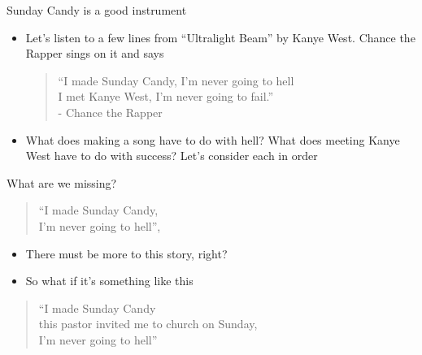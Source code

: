 \documentclass{beamer}
\begin{document}
\begin{frame}{Sunday Candy is a good instrument}

\begin{itemize}
		\item Let's listen to a few lines from ``Ultralight Beam'' by Kanye West. Chance the Rapper sings on it and says

\begin{quote}
``I made Sunday Candy, I'm never going to hell \\


I met Kanye West, I'm never going to fail.'' \\


- Chance the Rapper
\end{quote}

	\item What does making a song have to do with hell?  What does meeting Kanye West have to do with success? Let's consider each in order
	\end{itemize}
\end{frame}

\begin{frame}{What are we missing?}

			\begin{quote}
			``I made Sunday Candy, \\
			I'm never going to hell'', 
			\end{quote}
		\begin{itemize}
		\item There must be more to this story, right?
		\item So what if it's something like this
		\end{itemize}
			\begin{quote}
			``I made Sunday Candy \\
			 this pastor invited me to church on Sunday, \\
			  I'm never going to hell''
			\end{quote}

\end{frame}
\end{document}
